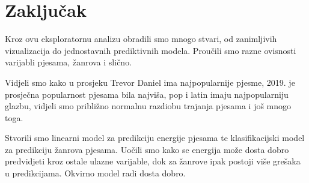 \chapter{Zaključak}

Kroz ovu eksploratornu analizu obradili smo mnogo stvari, od zanimljivih vizualizacija do jednostavnih prediktivnih modela. Proučili smo razne ovisnosti varijabli pjesama, žanrova i slično.
	
Vidjeli smo kako u prosjeku Trevor Daniel ima najpopularnije pjesme, 2019. je prosječna popularnost pjesama bila najviša, pop i latin imaju najpopularniju glazbu, vidjeli smo približno normalnu razdiobu trajanja pjesama i još mnogo toga.

 Stvorili smo linearni model za predikciju energije pjesama te klasifikacijski model za predikciju žanrova pjesama. Uočili smo kako se energija može dosta dobro predvidjeti kroz ostale ulazne varijable, dok za žanrove ipak postoji više grešaka u predikcijama. Okvirno model radi dosta dobro.

\eject



